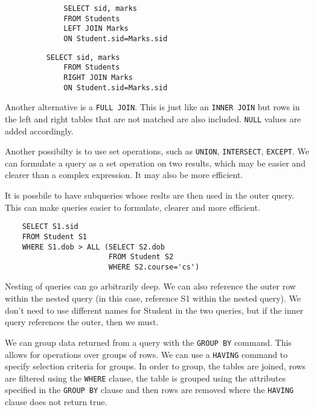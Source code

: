 \documentclass{article}
\begin{document}
	\begin{figure}[h]
		\begin{minipage}[t]{0.45\textwidth}
			\begin{verbatim}
		SELECT sid, marks
		FROM Students
		LEFT JOIN Marks
		ON Student.sid=Marks.sid
	\end{verbatim}
		\end{minipage}
		\hfill
		\begin{minipage}[t]{0.45\textwidth}
			\begin{verbatim}
	SELECT sid, marks
		FROM Students
		RIGHT JOIN Marks
		ON Student.sid=Marks.sid
	\end{verbatim}
		\end{minipage}
	\end{figure}
	
	\par 
	Another alternative is a \texttt{FULL JOIN}. This is just like an \texttt{INNER JOIN} but rows in the left and right tables that are not matched are also included. \texttt{NULL} values are added accordingly. 
	
	\par 
	Another possibilty is to use set operations, such as \texttt{UNION}, \texttt{INTERSECT}, \texttt{EXCEPT}. We can formulate a query as a set operation on two results, which may be easier and clearer than a complex expression. It may also be more efficient.
	
	\par 
	It is possbile to have subqueries whose reslts are then used in the outer query. This can make queries easier to formulate, clearer and more efficient. 
	
	\begin{verbatim}
	SELECT S1.sid
	FROM Student S1
	WHERE S1.dob > ALL (SELECT S2.dob
	                    FROM Student S2
	                    WHERE S2.course='cs')
	\end{verbatim}
	Nesting of queries can go arbitrarily deep. We can also reference the outer row within the nested query (in this case, reference S1 within the nested query). We don't need to use different names for Student in the two queries, but if the inner query references the outer, then we must.
	
	\par 
	We can group data returned from a query with the \texttt{GROUP BY} command. This allows for operations over groups of rows. We can use a \texttt{HAVING} command to specify selection criteria for groups. In order to group, the tables are joined, rows are filtered using the \texttt{WHERE} clause, the table is grouped using the attributes specified in the \texttt{GROUP BY} clause and then rows are removed where the \texttt{HAVING} clause does not return true.
	
\end{document}
